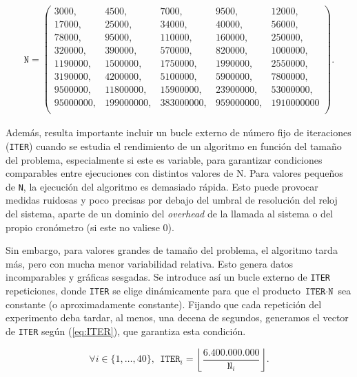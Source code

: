 \documentclass[11pt,a4paper,twoside]{article}
\theoremstyle{definition}
\begin{document}
	\begin{equation}\label{eq:n}
		\begin{aligned}
			\texttt{N} = \left(
			\begin{matrix}
				3000,      & 4500,      & 7000,      & 9500,      & 12000,		\\
				17000,     & 25000,     & 34000,     & 40000,     & 56000,		\\
				78000,     & 95000,     & 110000,    & 160000,    & 250000,		\\
				320000,    & 390000,    & 570000,    & 820000,    & 1000000,	\\
				1190000,   & 1500000,   & 1750000,   & 1990000,   & 2550000,	\\ 
				3190000,   & 4200000,   & 5100000,   & 5900000,   & 7800000,	\\
				9500000,   & 11800000,  & 15900000,  & 23900000,  & 53000000,	\\
				95000000,  & 199000000, & 383000000, & 959000000, & 1910000000	\\
			\end{matrix}
			\right).
		\end{aligned}
	\end{equation}

	Además, resulta importante incluir un bucle externo de número fijo de iteraciones (\texttt{ITER}) cuando se estudia el rendimiento de un algoritmo en función del tamaño del problema, especialmente si este es variable, para garantizar condiciones comparables entre ejecuciones con distintos valores de N. Para valores pequeños de \texttt{N}, la ejecución del algoritmo es demasiado rápida. Esto puede provocar medidas ruidosas y poco precisas por debajo del umbral de resolución del reloj del sistema, aparte de un dominio del \textit{overhead} de la llamada al sistema o del propio cronómetro (si este no valiese 0).
	
	Sin embargo, para valores grandes de tamaño del problema, el algoritmo tarda más, pero con mucha menor variabilidad relativa. Esto genera datos incomparables y gráficas sesgadas. Se introduce así un bucle externo de \texttt{ITER} repeticiones, donde \texttt{ITER} se elige dinámicamente para que el producto $\texttt{ITER} \cdot \texttt{N}$ sea constante (o aproximadamente constante). Fijando que cada repetición del experimento deba tardar, al menos, una decena de segundos, generamos el vector de \texttt{ITER} según (\ref{eq:ITER}), que garantiza esta condición.
	
	\begin{equation} \label{eq:ITER}
		\forall i \in \lbrace 1, \dots, 40 \rbrace, \:\: \texttt{ITER}_i = \left\lfloor \dfrac{6.400.000.000}{\texttt{N}_i} \right\rfloor.
	\end{equation}
\end{document}
